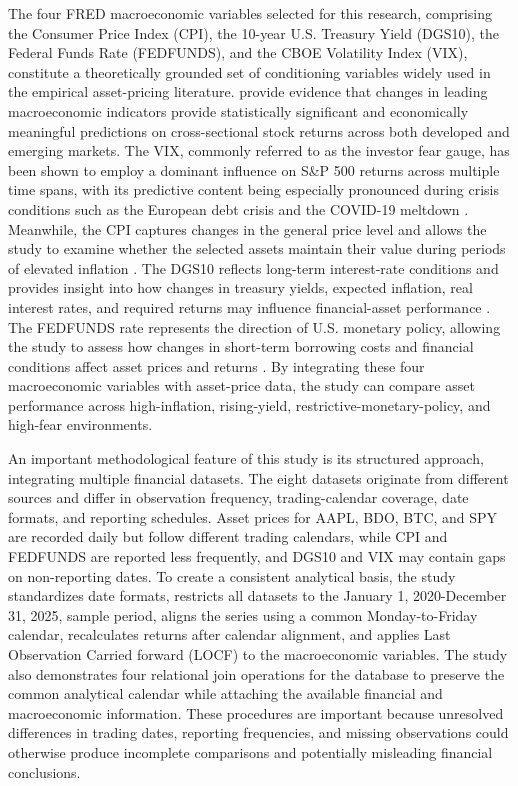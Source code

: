 The four FRED macroeconomic variables selected for this research, comprising the Consumer Price Index (CPI), the 10-year U.S. Treasury Yield (DGS10), the Federal Funds Rate (FEDFUNDS), and the CBOE Volatility Index (VIX), constitute a theoretically grounded set of conditioning variables widely used in the empirical asset-pricing literature. \parencite{long2022macroeconomics} provide evidence that changes in leading macroeconomic indicators provide statistically significant and economically meaningful predictions on cross-sectional stock returns across both developed and emerging markets. The VIX, commonly referred to as the investor fear gauge, has been shown to employ a dominant influence on S\&P 500 returns across multiple time spans, with its predictive content being especially pronounced during crisis conditions such as the European debt crisis and the COVID-19 meltdown \parencite{bouri2024fear}. Meanwhile, the CPI captures changes in the general price level and allows the study to examine whether the selected assets maintain their value during periods of elevated inflation \parencite{fama1977inflation}. The DGS10 reflects long-term interest-rate conditions and provides insight into how changes in treasury yields, expected inflation, real interest rates, and required returns may influence financial-asset performance \parencite{campbell1993markets}. The FEDFUNDS rate represents the direction of U.S. monetary policy, allowing the study to assess how changes in short-term borrowing costs and financial conditions affect asset prices and returns \parencite{bernanke2005stock}. By integrating these four macroeconomic variables with asset-price data, the study can compare asset performance across high-inflation, rising-yield, restrictive-monetary-policy, and high-fear environments. 

An important methodological feature of this study is its structured approach, integrating multiple financial datasets. The eight datasets originate from different sources and differ in observation frequency, trading-calendar coverage, date formats, and reporting schedules. Asset prices for AAPL, BDO, BTC, and SPY are recorded daily but follow different trading calendars, while CPI and FEDFUNDS are reported less frequently, and DGS10 and VIX may contain gaps on non-reporting dates. To create a consistent analytical basis, the study standardizes date formats, restricts all datasets to the January 1, 2020-December 31, 2025, sample period, aligns the series using a common Monday-to-Friday calendar, recalculates returns after calendar alignment, and applies Last Observation Carried forward (LOCF) to the macroeconomic variables. The study also demonstrates four relational join operations for the database to preserve the common analytical calendar while attaching the available financial and macroeconomic information. These procedures are important because unresolved differences in trading dates, reporting frequencies, and missing observations could otherwise produce incomplete comparisons and potentially misleading financial conclusions. 

